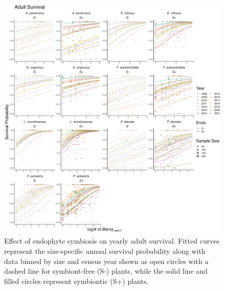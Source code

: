 \documentclass[9pt,twoside,lineno]{pnas-new}
\begin{document}
\begin{figure}
	\centering
	\includegraphics[width=\linewidth]{surv_yearplot.png}
	\caption{Effect of endophyte symbiosis on yearly adult survival. Fitted curves represent the size-specific annual survival probability along with data binned by size and census year shown as open circles with a dashed line for symbiont-free (S-) plants, while the solid line and filled circles represent symbiontic (S+) plants. }
\end{figure}
\end{document}
